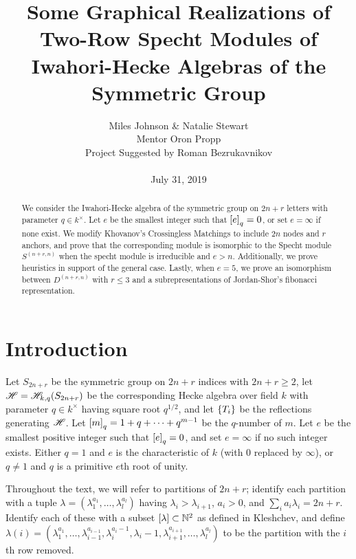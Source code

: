 \documentclass{amsart}
\begin{document}
\title[Some Graphical Realizations of Two-Row Specht Modules of Hecke Algebras]{Some Graphical Realizations of Two-Row Specht Modules of Iwahori-Hecke Algebras of the Symmetric Group}
\author[Miles Johnson \& Natalie Stewart]{Miles Johnson \& Natalie Stewart\\
  Mentor Oron Propp\\
Project Suggested by Roman Bezrukavnikov\\ \; \\
July 31, 2019
}

 \begin{titlepage}
  \maketitle
  \begin{abstract}
    We consider the Iwahori-Hecke algebra of the symmetric group on $2n + r$ letters with parameter $q \in k^\times$.
    Let $e$ be the smallest integer such that $\left[ e \right]_q = 0$, or set $e = \infty$ if none exist.
    We modify Khovanov's Crossingless Matchings to include $2n$ nodes and $r$ anchors, and prove that the corresponding module is isomorphic to the Specht module $S^{(n+r,n)}$ when the specht module is irreducible and $e > n$.
    Additionally, we prove heuristics in support of the general case.
    Lastly, when $e = 5$, we prove an isomorphism between $D^{(n+r,n)}$ with $r \leq 3$ and a subrepresentations of Jordan-Shor's fibonacci representation.
  \end{abstract}

\tableofcontents

\end{titlepage}

\section{Introduction}
Let $S_{2n+r}$ be the symmetric group on $2n+r$ indices with $2n + r \geq 2$, let $\mathscr{H} = \mathscr{H}_{k,q}(S_{2n+r})$ be the corresponding Hecke algebra over field $k$ with parameter $q \in k^\times$ having square root $q^{1/2}$, and let $\left\{ T_i \right\}$ be the reflections generating $\mathscr{H}$.
Let $\left[ m \right]_q = 1 + q + \dots + q^{m-1}$ be the $q$-number of $m$. 
Let $e$ be the smallest positive integer such that $\left[ e \right]_q = 0$, and set $e = \infty$ if no such integer exists.
Either $q = 1$ and $e$ is the characteristic of $k$ (with $0$ replaced by $\infty$), or $q \neq 1$ and $q$ is a primitive $e$th root of unity.

Throughout the text, we will refer to partitions of $2n + r$;
identify each partition with a tuple $\lambda = (\lambda_1^{a_1},\dots,\lambda_l^{a_l})$ having $\lambda_i > \lambda_{i+1}$, $a_i > 0$, and $\sum_i a_i\lambda_i = 2n + r$.
Identify each of these with a subset $\left[ \lambda \right] \subset \mathbb{N}^2$ as defined in Kleshchev, and define $\lambda(i) = (\lambda_1^{a_1},\dots,\lambda_{i-1}^{a_{i-1}},\lambda_i^{a_i - 1},\lambda_i-1,\lambda_{i+1}^{a_{i+1}},\dots,\lambda_l^{a_l})$ to be the partition with the $i$th row removed.
\end{document}
